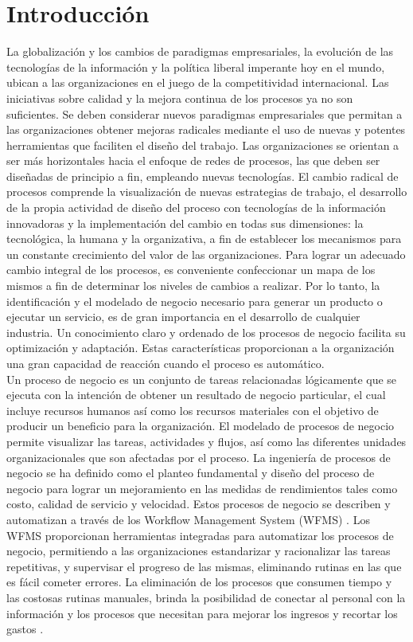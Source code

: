 \chapter{Introducci\'on}
\label{Introduccion}



\setcounter{page}{1}

La globalización y los cambios de paradigmas empresariales, la evolución de las tecnologías de la información y la política liberal imperante hoy en el mundo, ubican a las organizaciones en el juego de la competitividad internacional. Las iniciativas sobre calidad y la mejora continua de los procesos ya no son suficientes. Se deben considerar nuevos paradigmas empresariales que permitan a las organizaciones obtener mejoras radicales mediante el uso de nuevas y potentes herramientas que faciliten el diseño del trabajo. Las organizaciones se orientan a ser más horizontales hacia el enfoque de redes de procesos, las que deben ser diseñadas de principio a fin, empleando nuevas tecnologías. El cambio radical de procesos comprende la visualización de nuevas estrategias de trabajo, el desarrollo de la propia actividad de diseño del proceso con tecnologías de la información innovadoras y la implementación del cambio en todas sus dimensiones: la tecnológica, la humana y la organizativa, a fin de establecer los mecanismos para un constante crecimiento del valor de las organizaciones. Para lograr un adecuado cambio integral de los procesos, es conveniente confeccionar un mapa de los mismos a fin de determinar los niveles de cambios a realizar. Por lo tanto, la identificación y el modelado de negocio necesario para generar un producto o ejecutar un servicio, es de gran importancia en el desarrollo de cualquier industria. Un conocimiento claro y ordenado de los procesos de negocio facilita su optimización y adaptación. Estas características proporcionan a la organización una gran capacidad de reacción cuando el proceso es automático.	\\	
Un proceso de negocio es un conjunto de tareas relacionadas lógicamente que se ejecuta con la intención de obtener un resultado de negocio particular, el cual incluye recursos humanos así como los recursos materiales con el objetivo de producir un beneficio para la organización. El modelado de procesos de negocio permite visualizar las tareas, actividades y flujos, así como las diferentes unidades organizacionales que son afectadas por el proceso. La ingeniería de procesos de negocio se ha definido como el planteo fundamental y diseño del proceso de negocio para lograr un mejoramiento en las medidas de rendimientos tales como costo, calidad de servicio y velocidad. Estos procesos de negocio se describen y automatizan a través de los Workflow Management System (WFMS) . Los WFMS proporcionan herramientas integradas para automatizar los procesos de negocio, permitiendo a las organizaciones estandarizar y racionalizar las tareas repetitivas, y supervisar el progreso de las mismas, eliminando rutinas en las que es fácil cometer errores. La eliminación de los procesos que consumen tiempo y las costosas rutinas manuales, brinda la posibilidad de conectar al personal con la información y los procesos que necesitan para mejorar los ingresos y recortar los gastos \cite{WfMCa}.\\
